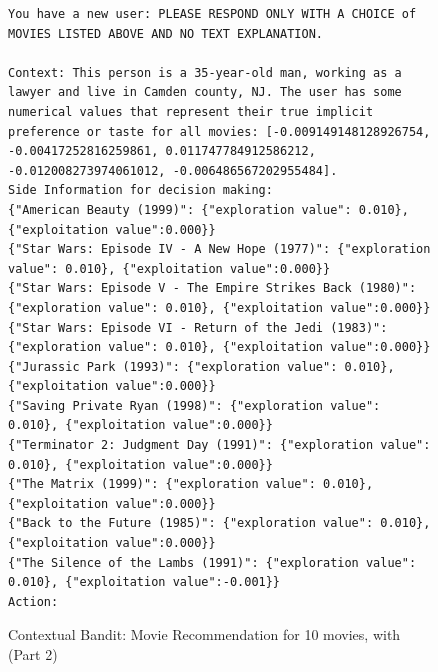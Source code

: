 \begin{figure}[ht]
\begin{lstlisting}[escapechar=!]
You have a new user: PLEASE RESPOND ONLY WITH A CHOICE of MOVIES LISTED ABOVE AND NO TEXT EXPLANATION.

Context: This person is a 35-year-old man, working as a lawyer and live in Camden county, NJ. The user has some numerical values that represent their true implicit preference or taste for all movies: [-0.009149148128926754, -0.00417252816259861, 0.011747784912586212, -0.012008273974061012, -0.006486567202955484].
Side Information for decision making:
{"American Beauty (1999)": {"exploration value": 0.010}, {"exploitation value":0.000}}
{"Star Wars: Episode IV - A New Hope (1977)": {"exploration value": 0.010}, {"exploitation value":0.000}}
{"Star Wars: Episode V - The Empire Strikes Back (1980)": {"exploration value": 0.010}, {"exploitation value":0.000}}
{"Star Wars: Episode VI - Return of the Jedi (1983)": {"exploration value": 0.010}, {"exploitation value":0.000}}
{"Jurassic Park (1993)": {"exploration value": 0.010}, {"exploitation value":0.000}}
{"Saving Private Ryan (1998)": {"exploration value": 0.010}, {"exploitation value":0.000}}
{"Terminator 2: Judgment Day (1991)": {"exploration value": 0.010}, {"exploitation value":0.000}}
{"The Matrix (1999)": {"exploration value": 0.010}, {"exploitation value":0.000}}
{"Back to the Future (1985)": {"exploration value": 0.010}, {"exploitation value":0.000}}
{"The Silence of the Lambs (1991)": {"exploration value": 0.010}, {"exploitation value":-0.001}}
Action: 
    \end{lstlisting}
    \caption{Contextual Bandit: Movie Recommendation for 10 movies, with \ag (Part 2)}
    \label{fig:cb_movie_10_rh_ag_part2}
\end{figure}
